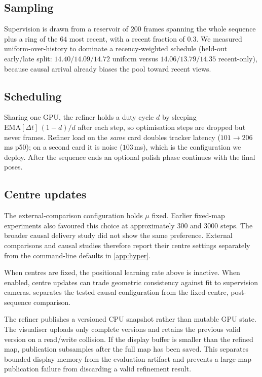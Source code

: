 \subsection{Sampling}
Supervision is drawn from a reservoir of $200$ frames spanning the whole
sequence plus a ring of the $64$ most recent, with a recent fraction of $0.3$.
We measured uniform-over-history to dominate a recency-weighted schedule
(held-out early/late split: $14.40/14.09/14.72$ uniform versus
$14.06/13.79/14.35$ recent-only), because causal arrival already biases the
pool toward recent views.

\subsection{Scheduling}
Sharing one GPU, the refiner holds a duty cycle $d$ by sleeping
$\mathrm{EMA}[\Delta t]\,(1-d)/d$ after each step, so optimisation steps are
dropped but never frames. Refiner load on the \emph{same} card doubles tracker
latency ($101\!\rightarrow\!206$\,ms p50); on a second card it is noise
($103$\,ms), which is the configuration we deploy. After the sequence ends an
optional polish phase continues with the final poses.

\subsection{Centre updates}
The external-comparison configuration holds $\mu$ fixed. Earlier fixed-map
experiments also favoured this choice at approximately $300$ and $3000$
steps. The broader causal delivery study did not show the same preference.
External comparisons and causal studies therefore report their centre
settings separately from the command-line defaults in \cref{app:hyper}.

When centres are fixed, the positional learning rate above is inactive.
When enabled, centre updates can trade geometric consistency against fit
to supervision cameras.  separates the tested causal
configuration from the fixed-centre, post-sequence comparison.

The refiner publishes a versioned CPU snapshot rather than mutable GPU state.
The visualiser uploads only complete versions and retains the previous valid
version on a read/write collision. If the display buffer is smaller than the
refined map, publication subsamples after the full map has been saved. This
separates bounded display memory from the evaluation artifact and prevents a
large-map publication failure from discarding a valid refinement result.

